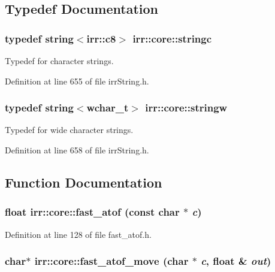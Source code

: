 \subsection{Typedef Documentation}
\hypertarget{namespaceirr_1_1core_996ee8f29e0c934ab4b7b6087d09f5f5}{
\subsubsection[{stringc}]{\setlength{\rightskip}{0pt plus 5cm}typedef {\bf string}$<${\bf irr::c8}$>$ {\bf irr::core::stringc}}}
\label{namespaceirr_1_1core_996ee8f29e0c934ab4b7b6087d09f5f5}


Typedef for character strings. 



Definition at line 655 of file irrString.h.\hypertarget{namespaceirr_1_1core_ef83fafbb1b36fcce44c07c9be23a7f2}{
\subsubsection[{stringw}]{\setlength{\rightskip}{0pt plus 5cm}typedef {\bf string}$<$wchar\_\-t$>$ {\bf irr::core::stringw}}}
\label{namespaceirr_1_1core_ef83fafbb1b36fcce44c07c9be23a7f2}


Typedef for wide character strings. 



Definition at line 658 of file irrString.h.

\subsection{Function Documentation}
\hypertarget{namespaceirr_1_1core_5af60e435db3af3df0bf89e1d2f55aa7}{
\subsubsection[{fast\_\-atof}]{\setlength{\rightskip}{0pt plus 5cm}float irr::core::fast\_\-atof (const char $\ast$ {\em c})}}
\label{namespaceirr_1_1core_5af60e435db3af3df0bf89e1d2f55aa7}




Definition at line 128 of file fast\_\-atof.h.\hypertarget{namespaceirr_1_1core_6256e94cb35bb421e71505abe0a6b137}{
\subsubsection[{fast\_\-atof\_\-move}]{\setlength{\rightskip}{0pt plus 5cm}char$\ast$ irr::core::fast\_\-atof\_\-move (char $\ast$ {\em c}, \/  float \& {\em out})}}
\label{namespaceirr_1_1core_6256e94cb35bb421e71505abe0a6b137}



